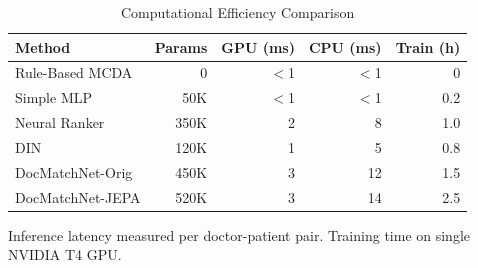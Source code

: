 \begin{table}[t]
\centering
\caption{Computational Efficiency Comparison}
\label{tab:efficiency}
\begin{tabular}{@{}lrrrr@{}}
\toprule
\textbf{Method} & \textbf{Params} & \textbf{GPU (ms)} & \textbf{CPU (ms)} & \textbf{Train (h)} \\
\midrule
Rule-Based MCDA     & 0       & $<$1   & $<$1   & 0     \\
Simple MLP          & 50K     & $<$1   & $<$1   & 0.2   \\
Neural Ranker       & 350K    & 2      & 8      & 1.0   \\
DIN                 & 120K    & 1      & 5      & 0.8   \\
DocMatchNet-Orig    & 450K    & 3      & 12     & 1.5   \\
DocMatchNet-JEPA    & 520K    & 3      & 14     & 2.5   \\
\bottomrule
\end{tabular}
\vspace{2mm}
\footnotesize{Inference latency measured per doctor-patient pair. Training time on single NVIDIA T4 GPU.}
\end{table}